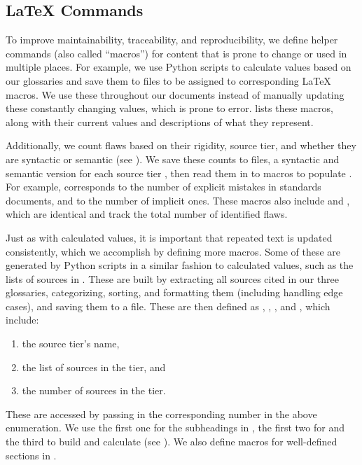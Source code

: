 \subsection[LaTeX Commands]{\LaTeX{} Commands}\label{macros}
To improve maintainability, traceability, and reproducibility, we define
helper commands (also called ``macros'') for content that is prone to change
or used in multiple places. For example, we use Python scripts to calculate
values based on our glossaries and save them to files to be assigned to
corresponding \LaTeX{} macros. We use these throughout our documents instead of
manually updating these constantly changing values, which is prone to error.
 lists these macros, along with their current values and
descriptions of what they represent.



\label{flawCounts}
Additionally, we count flaws based on their rigidity, source tier,
and whether they are syntactic or semantic (see
).
We save these counts to files, a syntactic and semantic version for each
source tier%
, then read them in to macros
to populate . For example,
 corresponds to the number of explicit mistakes in
standards documents, and  to the number of implicit
ones. These macros also include  and \newline
{}, which are identical and
track the total number of identified flaws.

\label{text-macros}
Just as with calculated values, it is important that repeated text is updated
consistently, which we accomplish by defining more macros. Some of these are
generated by Python scripts in a similar fashion to calculated values, such as
the lists of sources in . These are built by extracting all
sources cited in our three glossaries, categorizing, sorting, and formatting
them (including handling edge cases), and saving them to a file. These are then
defined as , , , and
, which include:
\begin{enumerate}
    \item the source tier's name,
    \item the list of sources in the tier, and
    \item the number of sources in the tier.
\end{enumerate}
These are accessed by passing in the corresponding number in the above
enumeration. We use the first one for the subheadings in , the
first two for  and the third to build 
and calculate  (see ). We also define
macros for well-defined sections in .

